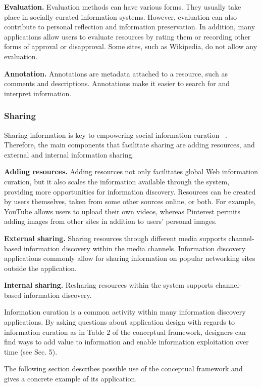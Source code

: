 \documentclass{casconpaper}
\begin{document}
{{\textbf{Evaluation.} Evaluation methods can have various forms. They usually take place in socially curated information systems. However, evaluation can also contribute to personal reflection and information preservation. In addition, many applications allow users to evaluate resources by rating them or recording other forms of approval or disapproval. Some sites, such as Wikipedia, do not allow any evaluation. 

\textbf{Annotation.} Annotations are metadata attached to a resource, such as comments and descriptions. Annotations make it easier to search for and interpret information. 
} %

{\subsubsection{Sharing}
Sharing information is key to empowering social information curation ~\cite{beagrie}. Therefore, the main components that facilitate sharing are adding resources, and external and internal information sharing.

\textbf{Adding resources.} Adding resources not only facilitates global Web information curation, but it also scales the information available through the system, providing more opportunities for information discovery. Resources can be created by users themselves, taken from some other sources online, or both. For example, YouTube allows users to upload their own videos, whereas Pinterest permits adding images from other sites in addition to users' personal images. 

\textbf{External sharing.} Sharing resources through different media supports channel-based information discovery within the media channels. Information discovery applications commonly allow for sharing information on popular networking sites outside the application.

\textbf{Internal sharing.} Resharing resources within the system supports channel-based information discovery. 
} %

Information curation is a common activity within many information discovery applications. By asking questions about application design with regards to information curation as in Table 2 of the conceptual framework, designers can find ways to add value to information and enable information exploitation over time (see Sec. 5).

The following section describes possible use of the conceptual framework and gives a concrete example of its application.

}
\end{document}
